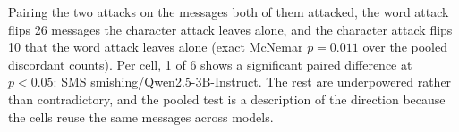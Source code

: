Pairing the two attacks on the messages both of them attacked, the word attack flips 26 messages the character attack leaves alone, and the character attack flips 10 that the word attack leaves alone (exact McNemar $p = 0.011$ over the pooled discordant counts).
Per cell, 1 of 6 shows a significant paired difference at $p<0.05$: SMS smishing/Qwen2.5-3B-Instruct. The rest are underpowered rather than contradictory, and the pooled test is a description of the direction because the cells reuse the same messages across models.
